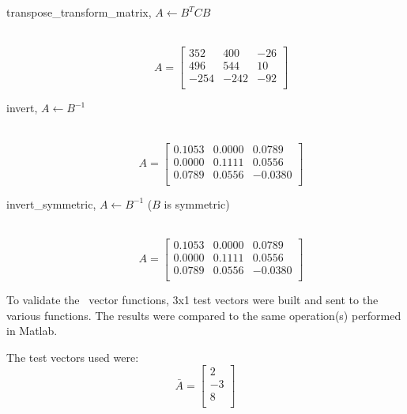 \begin{description}
  \item[transpose\_transform\_matrix, $A \leftarrow B^T CB$]\ \newline
    \begin{equation}\nonumber
    A = \left[
    \begin{array}{rrr}
     352  &  400  &  -26 \\
     496  &  544  &   10 \\
    -254  & -242  &  -92 \\
    \end{array}\right]
    \end{equation}

  \item[invert, $A \leftarrow B^{-1}$]\ \newline
    \begin{equation}\nonumber
    A = \left[
    \begin{array}{rrr}
     0.1053  &  0.0000  &  0.0789 \\
     0.0000  &  0.1111  &  0.0556 \\
     0.0789  &  0.0556  & -0.0380 \\
    \end{array}\right]
    \end{equation}

  \item[invert\_symmetric, $A \leftarrow B^{-1}$ ($B$ is symmetric)]\ \newline
    \begin{equation}\nonumber
    A = \left[
    \begin{array}{rrr}
     0.1053  &  0.0000  &  0.0789 \\
     0.0000  &  0.1111  &  0.0556 \\
     0.0789  &  0.0556  & -0.0380 \\
    \end{array}\right]
    \end{equation}

\end{description}


\label{test:vector_math}
To validate the \mathDesc\ vector functions, 3x1 test vectors were
built and sent to the various functions. The results were compared to
the same operation(s) performed in Matlab.  

The test vectors used were:
\begin{equation}\nonumber
\bar{A} = \left[
\begin{array}{r}
  2 \\
 -3 \\
  8 \\
\end{array}\right]
\end{equation}

